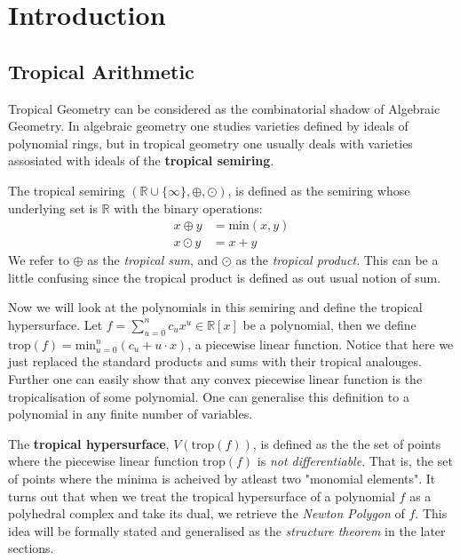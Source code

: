 
\section{Introduction}
    \subsection{Tropical Arithmetic}
    Tropical Geometry can be considered as the combinatorial shadow of Algebraic Geometry. In algebraic geometry one studies varieties defined by ideals of polynomial rings, but in tropical geometry one usually deals with varieties assosiated with ideals of the \textbf{tropical semiring}.
    \begin{definition} The tropical semiring $(\mathbb{R} \cup \{\infty\}, \oplus, \odot)$, is defined as the semiring whose underlying set is $\mathbb{R}$ with the binary operations: 
        \begin{align*}
            x \oplus y &= \text{min}(x,y)\\
            x \odot y  &= x + y
        \end{align*}
    We refer to $\oplus$ as the \textit{tropical sum}, and $\odot$ as the \textit{tropical product}. This can be a little confusing since the tropical product is defined as out usual notion of sum.
    \end{definition}
    Now we will look at the polynomials in this semiring and define the tropical hypersurface. 
    Let $f = \sum_{u=0}^{n} c_u x^u \in \mathbb{R}[x]$ be a polynomial, then we define $\text{trop}(f) = \text{min}_{u=0}^{n}(c_u + u\cdot x)$, a piecewise linear function. 
    Notice that here we just replaced the standard products and sums with their tropical analouges.
    Further one can easily show that any convex piecewise linear function is the tropicalisation of some polynomial.
    One can generalise this definition to a polynomial in any finite number of variables.
    \par The \textbf{tropical hypersurface}, $V(\text{trop}(f))$, is defined as the the set of points where the piecewise linear function $\text{trop}(f)$ is \textit{not differentiable}.
    That is, the set of points where the minima is acheived by atleast two "monomial elements".
    It turns out that when we treat the tropical hypersurface of a polynomial $f$ as a polyhedral complex and take its dual, we retrieve the \textit{Newton Polygon} of $f$. This idea will be formally stated and generalised as the \textit{structure theorem} in the later sections.
